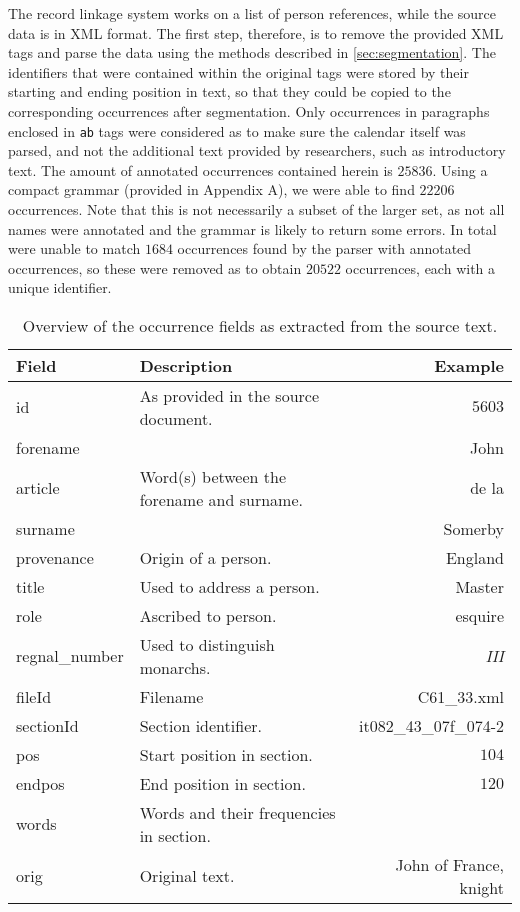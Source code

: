 The record linkage system works on a list of person references, while the source data is in XML format.
The first step, therefore, is to remove the provided XML tags and parse the data using the methods described in \cref{sec:segmentation}.
The identifiers that were contained within the original tags were stored by their starting and ending position in text, so that they could be copied to the corresponding occurrences after segmentation.
Only occurrences in paragraphs enclosed in \texttt{ab} tags were considered as to make sure the calendar itself was parsed, and not the additional text provided by researchers, such as introductory text.
The amount of annotated occurrences contained herein is $25836$.
Using a compact grammar (provided in Appendix A), we were able to find $22206$ occurrences.
Note that this is not necessarily a subset of the larger set, as not all names were annotated and the grammar is likely to return some errors. 
In total were unable to match $1684$ occurrences found by the parser with annotated occurrences, so these were removed as to obtain $20522$ occurrences, each with a unique identifier.

\begin{table}
    \footnotesize
    \centering
    \begin{tabularx}{\textwidth}{l X r}
        \toprule
        \textbf{Field} & \textbf{Description} & \textbf{Example} \\
        \midrule
        id & As provided in the source document. & $5603$ \\
        forename & & John \\
        article & Word(s) between the forename and surname. & de la \\
        surname & & Somerby \\
        provenance & Origin of a person. & England \\
        title & Used to address a person. & Master \\
        role & Ascribed to person. & esquire \\
        regnal\_number & Used to distinguish monarchs. & \emph{III} \\
        fileId & Filename & C61\_33.xml \\
        sectionId & Section identifier. & it082\_43\_07f\_074-2 \\
        pos & Start position in section. & $104$ \\
        endpos & End position in section. & $120$ \\
        words & Words and their frequencies in section. & \\
        orig & Original text. & John of France, knight \\
        \bottomrule
    \end{tabularx}
    \caption{Overview of the occurrence fields as extracted from the source text.}
    \label{tab:occurrence_overview}
\end{table}

